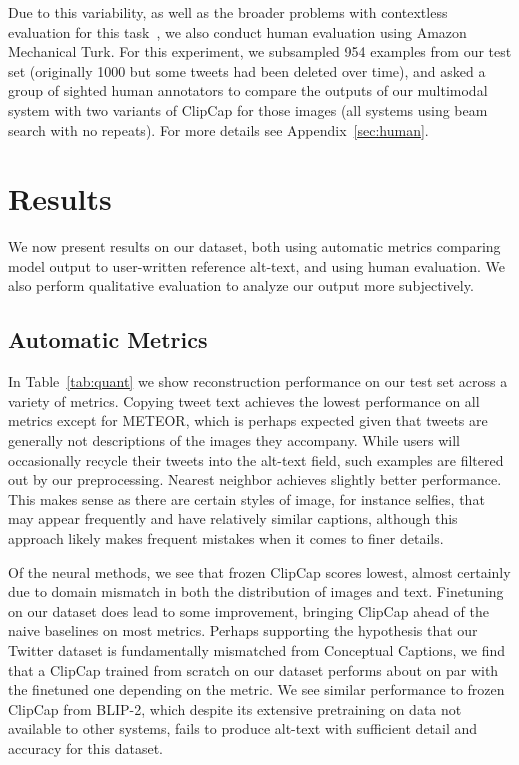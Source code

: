 \documentclass{article} %
\begin{document}
Due to this variability, as well as the broader problems with contextless evaluation for this task~\citep{contextmatters}, we also conduct human evaluation using Amazon Mechanical Turk.
For this experiment, we subsampled 954 examples from our test set (originally 1000 but some tweets had been deleted over time), and asked a group of sighted human annotators to compare the outputs of our multimodal system with two variants of ClipCap for those images (all systems using beam search with no repeats).
For more details see Appendix~\ref{sec:human}.

\section{Results}

We now present results on our dataset, both using automatic metrics comparing model output to user-written reference alt-text, and using human evaluation.
We also perform qualitative evaluation to analyze our output more subjectively.

\subsection{Automatic Metrics}



In Table~\ref{tab:quant} we show reconstruction performance on our test set across a variety of metrics.
Copying tweet text achieves the lowest performance on all metrics except for METEOR, which is perhaps expected given that tweets are generally not descriptions of the images they accompany.
While users will occasionally recycle their tweets into the alt-text field, such examples are filtered out by our preprocessing.
Nearest neighbor achieves slightly better performance.
This makes sense as there are certain styles of image, for instance selfies, that may appear frequently and have relatively similar captions, although this approach likely makes frequent mistakes when it comes to finer details.

Of the neural methods, we see that frozen ClipCap scores lowest, almost certainly due to domain mismatch in both the distribution of images and text.
Finetuning on our dataset does lead to some improvement, bringing ClipCap ahead of the naive baselines on most metrics.
Perhaps supporting the hypothesis that our Twitter dataset is fundamentally mismatched from Conceptual Captions, we find that a ClipCap trained from scratch on our dataset performs about on par with the finetuned one depending on the metric.
We see similar performance to frozen ClipCap from BLIP-2, which despite its extensive pretraining on data not available to other systems, fails to produce alt-text with sufficient detail and accuracy for this dataset.
\end{document}
